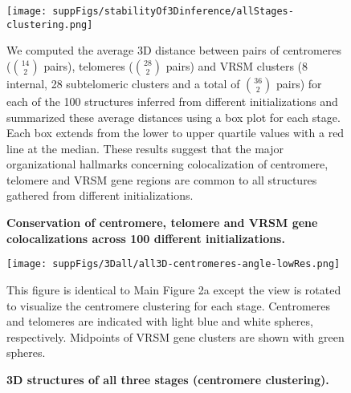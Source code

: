 \documentclass{article}
\begin{document}
\begin{figure}
  \begin{center}
  \texttt{[image: suppFigs/stabilityOf3Dinference/allStages-clustering.png]}
  \end{center}
\caption{{\bf Conservation of centromere, telomere and VRSM gene colocalizations across 100 different initializations. }}
{ We computed the average 3D distance between pairs of centromeres (${14 \choose 2}$ pairs),
telomeres (${28 \choose 2}$ pairs) and VRSM clusters (8 internal, 28 subtelomeric clusters and a total of ${36 \choose 2}$ pairs)
for each of the 100 structures inferred from different initializations and summarized
these average distances using a box plot for each stage. Each box extends from the
lower to upper quartile values with a red line at the median.  These results suggest that
the major organizational hallmarks concerning colocalization of centromere, telomere and
VRSM gene regions are common to all structures gathered from different initializations.}
\label{suppfig:clusteringIn100Structures}
\end{figure}
\clearpage




\begin{figure}
  \begin{center}
  \texttt{[image: suppFigs/3Dall/all3D-centromeres-angle-lowRes.png]}
   \end{center}
\caption{{\bf 3D structures of all three stages (centromere clustering).}}
{This figure is identical to Main Figure 2a except the view is rotated to visualize the centromere
clustering for each stage. Centromeres and telomeres are indicated with light blue and white spheres,
respectively. Midpoints of VRSM gene clusters are shown with green spheres.}
\label{suppfig:3Dcentromeres}
\end{figure}
\clearpage
\end{document}
